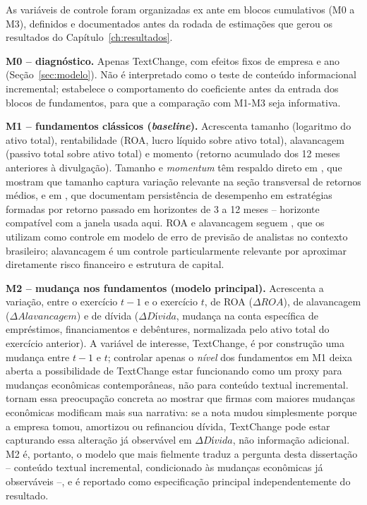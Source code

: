 \documentclass[a4paper,12pt]{report}
\begin{document}
As variáveis de controle foram organizadas ex ante em blocos cumulativos (M0 a M3), definidos e documentados antes da rodada de estimações que gerou os resultados do Capítulo~\ref{ch:resultados}.

\textbf{M0 -- diagnóstico.} Apenas TextChange, com efeitos fixos de empresa e ano (Seção~\ref{sec:modelo}). Não é interpretado como o teste de conteúdo informacional incremental; estabelece o comportamento do coeficiente antes da entrada dos blocos de fundamentos, para que a comparação com M1-M3 seja informativa.

\textbf{M1 -- fundamentos clássicos (\textit{baseline}).} Acrescenta tamanho (logaritmo do ativo total), rentabilidade (ROA, lucro líquido sobre ativo total), alavancagem (passivo total sobre ativo total) e momento (retorno acumulado dos 12 meses anteriores à divulgação). Tamanho e \textit{momentum} têm respaldo direto em , que mostram que tamanho captura variação relevante na seção transversal de retornos médios, e em , que documentam persistência de desempenho em estratégias formadas por retorno passado em horizontes de 3 a 12 meses -- horizonte compatível com a janela usada aqui. ROA e alavancagem seguem , que os utilizam como controle em modelo de erro de previsão de analistas no contexto brasileiro; alavancagem é um controle particularmente relevante por aproximar diretamente risco financeiro e estrutura de capital.

\textbf{M2 -- mudança nos fundamentos (\textbf{modelo principal}).} Acrescenta a variação, entre o exercício $t-1$ e o exercício $t$, de ROA ($\Delta\mathit{ROA}$), de alavancagem ($\Delta\mathit{Alavancagem}$) e de dívida ($\Delta\mathit{Dívida}$, mudança na conta específica de empréstimos, financiamentos e debêntures, normalizada pelo ativo total do exercício anterior). A variável de interesse, TextChange, é por construção uma mudança entre $t-1$ e $t$; controlar apenas o \emph{nível} dos fundamentos em M1 deixa aberta a possibilidade de TextChange estar funcionando como um proxy para mudanças econômicas contemporâneas, não para conteúdo textual incremental.  tornam essa preocupação concreta ao mostrar que firmas com maiores mudanças econômicas modificam mais sua narrativa: se a nota mudou simplesmente porque a empresa tomou, amortizou ou refinanciou dívida, TextChange pode estar capturando essa alteração já observável em $\Delta\mathit{Dívida}$, não informação adicional. M2 é, portanto, o modelo que mais fielmente traduz a pergunta desta dissertação -- conteúdo textual incremental, condicionado às mudanças econômicas já observáveis --, e é reportado como especificação principal independentemente do resultado.
\end{document}
